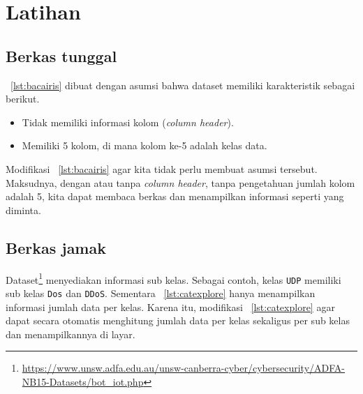 

\section{Latihan}
\subsection{Berkas tunggal}
\lstlistingname~\ref{lst:bacairis} dibuat dengan asumsi bahwa dataset memiliki karakteristik sebagai berikut.
\begin{itemize}
  \item Tidak memiliki informasi kolom (\textit{column header}).
  \item Memiliki 5 kolom, di mana kolom ke-5 adalah kelas data.
\end{itemize}
Modifikasi \lstlistingname~\ref{lst:bacairis} agar kita tidak perlu membuat asumsi tersebut. Maksudnya, dengan atau tanpa \textit{column header}, tanpa pengetahuan jumlah kolom adalah 5, kita dapat membaca berkas dan menampilkan informasi seperti yang diminta.

\subsection{Berkas jamak}
Dataset\footnote{\url{https://www.unsw.adfa.edu.au/unsw-canberra-cyber/cybersecurity/ADFA-NB15-Datasets/bot\_iot.php}} menyediakan informasi sub kelas. Sebagai contoh, kelas \texttt{UDP} memiliki sub kelas \texttt{Dos} dan \texttt{DDoS}. Sementara \lstlistingname~\ref{lst:catexplore} hanya menampilkan informasi jumlah data per kelas. Karena itu, modifikasi \lstlistingname~\ref{lst:catexplore} agar dapat secara otomatis menghitung jumlah data per kelas sekaligus per sub kelas dan menampilkannya di layar.
